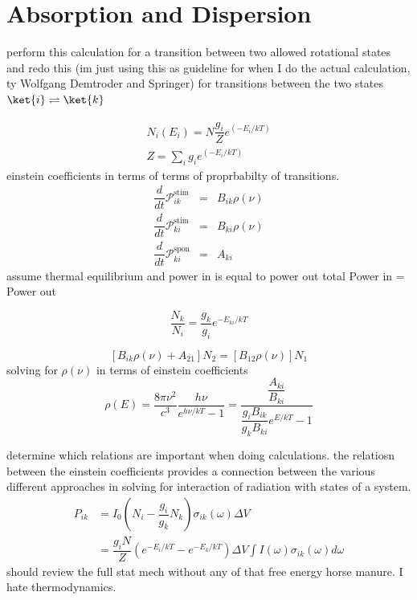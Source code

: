 \documentclass[11pt,a4paper]{book}
\begin{document}
\chapter{Absorption and Dispersion}
\label{chp:Absorption and Dispersion}
perform this calculation for a transition between two allowed rotational states and redo this (im just using this as guideline for when I do the actual calculation, ty Wolfgang Demtroder and Springer)
for transitions between the two states $\ket{i} \rightleftharpoons \ket{k}$

\begin{eqnarray}
N_i(E_i) = N \dfrac{g_i}{Z}
e^{\left(-E_i/kT\right)}
\\
Z=\sum_i{g_ie^{\left(-E_i/kT\right)}}
\end{eqnarray}
einstein coefficients in terms of terms of proprbabilty of transitions.
\begin{eqnarray}
\dfrac{d}{dt} \mathcal{P}_{ik}^{\mathrm{stim}} & = & B_{ik}\rho({\nu}) 
\\
\dfrac{d}{dt} \mathcal{P}_{ki}^{\mathrm{stim}} & = & B_{ki}\rho({\nu}) 
\\
\dfrac{d}{dt} \mathcal{P}_{ki}^{\mathrm{spon}} & = & A_{ki} 
\end{eqnarray}
assume thermal equilibrium and power in is equal to power out total Power in = Power out

\begin{equation}
\dfrac{N_k}{N_i}=\dfrac{g_k}{g_i} e^{-E_{ki}/kT}
\end{equation}	

\begin{equation}
\left[ B_{ik}\rho({\nu}) + A_{21} \right]N_2 
= 
\left[ B_{12}\rho({\nu}) \right] N_1
\end{equation}
solving for $\rho(\nu)$ in terms of einstein coefficients	
\begin{equation}
\displaystyle
\rho(E)=\dfrac{8\pi \nu^2}{c^3}\dfrac{h\nu}{e^{h\nu/kT}-1}
=
\dfrac{\dfrac{A_{ki}}{B_{ki}}}{\dfrac{g_i B_{ik}}{g_k B_{ki}} e^{E/kT} - 1}
\end{equation}


determine which relations are important when doing calculations. the relatiosn between the einstein coefficients provides a connection between the various different approaches in solving for interaction of radiation with states of a system.
\begin{equation}
\begin{split}
\displaystyle
P_{ik} &= I_0 \left(N_i -\dfrac{g_i}{g_k} N_k
\right) 
\sigma_{ik}(\omega)\Delta V \\
& = \dfrac{g_iN}{Z} \left( e^{-E_i/kT}- e^{-E_k/kT}
\right)
\Delta V \int{I(\omega)\sigma_{ik}(\omega)d\omega}
\end{split}
\end{equation}
should review the full stat mech without any of that free energy horse manure. I hate thermodynamics.	
\end{document}
